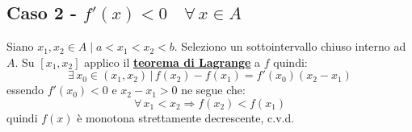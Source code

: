 \documentclass[../../analisi1]{subfiles}
\begin{document}
            \subsection*{Caso 2 - \( f'(x) < 0 \quad \forall \, x \in A \)}

            Siano \(x_1, x_2 \in A \mid a < x_1 < x_2 < b \). Seleziono un sottointervallo chiuso interno ad \(A\).
            Su \( [x_1, x_2] \) applico il \textbf{\hyperref[teoLagrange]{teorema di Lagrange}} a \(f\) quindi:
            \[
                \exists \, x_0 \in (x_1, x_2) \, | \, f(x_2) - f(x_1) = f'(x_0)(x_2 - x_1) 
            \]
            essendo \( f'(x_0) < 0 \) e \( x_2 - x_1 > 0 \) ne segue che:
            \[
                \forall \, x_1 < x_2 \Rightarrow f(x_2) < f(x_1)
            \]
            quindi \(f(x)\) è monotona strettamente decrescente, c.v.d.
    
    
\end{document}
